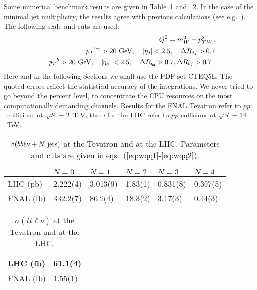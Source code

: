 \documentclass[paper]{JHEP3}
\newcommand{\gev}{\mbox{GeV}}
\newcommand{\ccaption}[2]{
    \begin{center}
    \parbox{0.85\textwidth}{
      \caption[#1]{\small{{#2}}}
      }
    \end{center}
    }
\def    \ba             {\begin{eqnarray}}
\def    \ea             {\end{eqnarray}}
\def    \gev            {\mbox{$\mathrm{GeV}$}}
\def    \bbar   {\bar{b}}
\def    \tbar   {\bar{t}}
\def    \mWsq             {\mbox{$m_W^2$} }
\def    \pt             {\mbox{$p_T$}}
\def    \ptWsq           {\mbox{$p^2_{T,W}$}}
\def\ppbar{\mbox{$p \bar{p}$}}
\begin{document}
Some numerical benchmark results are given in
Table~\ref{tab:wbbxs} and ~\ref{tab:wttxs}. 
In the case of the minimal jet multiplicity, the results agree with
previous calculations (see e.g.~\cite{Kunszt:1984ri,Mangano:1993kp}).
The following scale and cuts are used:
\ba \label{eq:wqq1}
&& Q^2 = \mWsq + \ptWsq,
\\
        && \pt^{\rm jet}>20~\gev, \quad \vert \eta_j\vert < 2.5, \quad \Delta
        R_{jj} >0.7
\\
        && \pt^{b}>20~\gev, \quad \vert \eta_b \vert < 2.5, \quad \Delta
        R_{b\bbar} >0.7, \Delta R_{bj} >0.7 \; .
\label{eq:wqq2}
\ea
Here and in the following Sections we shall use
the PDF set CTEQ5L. The quoted errors reflect the statistical accuracy
of the integrations. We never tried to go beyond the percent level, to
concentrate the CPU resources on the most computationally demanding channels.
Results for the FNAL Tevatron refer to \ppbar\
collisions at $\sqrt{S}=2$~TeV, those for the LHC refer to $pp$
collisions at $\sqrt{S}=14$~TeV.

{\renewcommand{\arraystretch}{1.2}
\begin{table}
\begin{center}
\begin{tabular}{||l|l|l|l|l|l||}\hline
 & $N = 0$  & $N = 1$ & $N = 2$ & $N = 3$ & $N = 4$
                 \\  \hline
LHC (pb)   & 2.222(4) & 3.013(9) & 1.83(1) & 0.831(8) & 0.307(5)
\\ \hline
FNAL (fb)  &  332.2(7) & 86.2(4) & 18.3(2) & 3.17(3) & 0.44(3)
\\ \hline
\end{tabular}            
\ccaption{}{\label{tab:wbbxs} $\sigma(b \bbar \ell \nu + N~{\rm jets})$
at the Tevatron and 
at the LHC. Parameters and cuts are given
in eqs.~(\ref{eq:wqq1}-\ref{eq:wqq2}). }
\end{center}
\end{table}}

{\renewcommand{\arraystretch}{1.2}
\begin{table}
\begin{center}
\begin{tabular}{||l|l||}\hline
LHC (fb)   & 61.1(4)
\\ \hline
FNAL (fb)  &  1.55(1)
\\ \hline
\end{tabular}            
\ccaption{}{\label{tab:wttxs} $\sigma(t \tbar \ell \nu)$
at the Tevatron and 
at the LHC.}
\end{center}
\end{table}}
\end{document}
